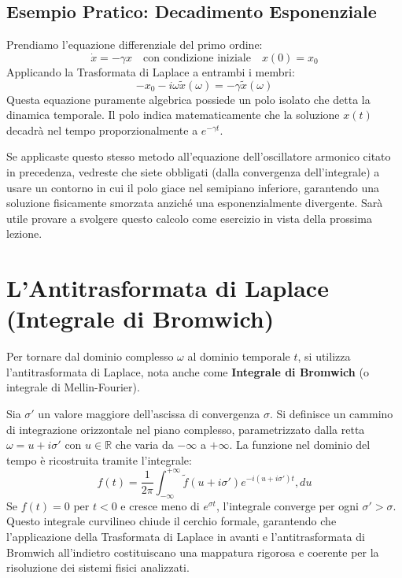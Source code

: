 \subsection{Esempio Pratico: Decadimento Esponenziale}
Prendiamo l'equazione differenziale del primo ordine:
\begin{equation}
\dot{x} = -\gamma x \quad \text{con condizione iniziale} \quad x(0) = x_0
\end{equation}
Applicando la Trasformata di Laplace a entrambi i membri:
\begin{equation}
-x_0 - i\omega \tilde{x}(\omega) = -\gamma \tilde{x}(\omega)
\end{equation}
Questa equazione puramente algebrica possiede un polo isolato che detta la dinamica temporale. Il polo indica matematicamente che la soluzione $x(t)$ decadrà nel tempo proporzionalmente a $e^{-\gamma t}$.

Se applicaste questo stesso metodo all'equazione dell'oscillatore armonico citato in precedenza, vedreste che siete obbligati (dalla convergenza dell'integrale) a usare un contorno in cui il polo giace nel semipiano inferiore, garantendo una soluzione fisicamente smorzata anziché una esponenzialmente divergente. Sarà utile provare a svolgere questo calcolo come esercizio in vista della prossima lezione.

\section{L'Antitrasformata di Laplace (Integrale di Bromwich)}

Per tornare dal dominio complesso $\omega$ al dominio temporale $t$, si utilizza l'antitrasformata di Laplace, nota anche come \textbf{Integrale di Bromwich} (o integrale di Mellin-Fourier).

Sia $\sigma'$ un valore maggiore dell'ascissa di convergenza $\sigma$. Si definisce un cammino di integrazione orizzontale nel piano complesso, parametrizzato dalla retta $\omega = u + i\sigma'$ con $u \in \mathbb{R}$ che varia da $-\infty$ a $+\infty$.
La funzione nel dominio del tempo è ricostruita tramite l'integrale:
\begin{equation}
f(t) = \frac{1}{2\pi} \int_{-\infty}^{+\infty} \tilde{f}(u + i\sigma') e^{-i(u + i\sigma')t} , du
\end{equation}
Se $f(t) = 0$ per $t < 0$ e cresce meno di $e^{\sigma t}$, l'integrale converge per ogni $\sigma' > \sigma$. Questo integrale curvilineo chiude il cerchio formale, garantendo che l'applicazione della Trasformata di Laplace in avanti e l'antitrasformata di Bromwich all'indietro costituiscano una mappatura rigorosa e coerente per la risoluzione dei sistemi fisici analizzati.

